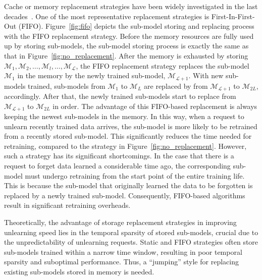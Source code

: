\documentclass[conference,compsoc]{IEEEtran}
\begin{document}
Cache or memory replacement strategies have been widely investigated in the last decades~\cite{podlipnig2003survey}. One of the most representative replacement strategies is First-In-First-Out (FIFO). Figure~\ref{fig:fifo} depicts the sub-model storing and replacing process with the FIFO replacement strategy. Before the memory resources are fully used up by storing sub-models, the sub-model storing process is exactly the same as that in Figure~\ref{fig:no_replacement}. After the memory is exhausted by storing $\mathcal{M}_1, \mathcal{M}_2, \dots, \mathcal{M}_l, \dots, \mathcal{M}_{\mathcal{L}}$, the FIFO replacement strategy replaces the sub-model $\mathcal{M}_1$ in the memory by the newly trained sub-model, \eg $\mathcal{M}_{\mathcal{L}+1}$. With new sub-models trained, sub-models from $\mathcal{M}_1$ to $\mathcal{M}_{L}$ are replaced by from $\mathcal{M}_{\mathcal{L}+1}$ to $\mathcal{M}_{2L}$, accordingly. After that, the newly trained sub-models start to replace from $\mathcal{M}_{\mathcal{L}+1}$ to $\mathcal{M}_{2L}$ in order. The advantage of this FIFO-based replacement is always keeping the newest sub-models in the memory. In this way, when a request to unlearn recently trained data arrives, the sub-model is more likely to be retrained from a recently stored sub-model. This significantly reduces the time needed for retraining, compared to the strategy in Figure~\ref{fig:no_replacement}. However, such a strategy has its significant shortcomings. In the case that there is a request to forget data learned a considerable time ago, the corresponding sub-model must undergo retraining from the start point of the entire training life. This is because the sub-model that originally learned the data to be forgotten is replaced by a newly trained sub-model. Consequently, FIFO-based algorithms result in significant retraining overheads.

Theoretically, the advantage of storage replacement strategies in improving unlearning speed lies in the temporal sparsity of stored sub-models, crucial due to the unpredictability of unlearning requests. Static and FIFO strategies often store sub-models trained within a narrow time window, resulting in poor temporal sparsity and suboptimal performance. Thus, a ``jumping'' style for replacing existing sub-models stored in memory is needed.
\end{document}

